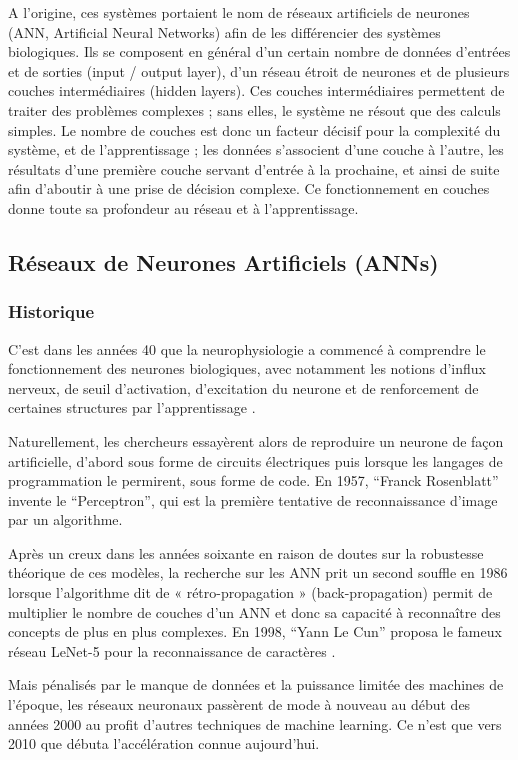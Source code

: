 \documentclass[12pt]{article}
\begin{document}
A l'origine, ces systèmes portaient le nom de réseaux artificiels de neurones (ANN, Artificial Neural Networks) afin de les différencier des systèmes biologiques. Ils se composent en général d’un certain nombre de données d'entrées et de sorties (input / output layer), d’un réseau étroit de neurones et de plusieurs couches intermédiaires (hidden layers). Ces couches intermédiaires permettent de traiter des problèmes complexes ; sans elles, le système ne résout que des calculs simples. Le nombre de couches est donc un facteur décisif pour la complexité du système, et de l’apprentissage ; les données s’associent d’une couche à l’autre, les résultats d’une première couche servant d’entrée à la prochaine, et ainsi de suite afin d’aboutir à une prise de décision complexe. Ce fonctionnement en couches donne toute sa profondeur au réseau et à l’apprentissage.
\subsection{Réseaux de Neurones Artificiels (ANNs)}
\subsubsection{Historique}
C’est dans les années 40 que la neurophysiologie a commencé à comprendre le fonctionnement des neurones biologiques, avec notamment les notions d’influx nerveux, de seuil d’activation, d’excitation du neurone et de renforcement de certaines structures par l’apprentissage \cite{11}.

Naturellement, les chercheurs essayèrent alors de reproduire un neurone de façon artificielle, d’abord sous forme de circuits électriques puis lorsque les langages de programmation le permirent, sous forme de code. En 1957, “Franck Rosenblatt” invente le “Perceptron”, qui est la première tentative de reconnaissance d’image par un algorithme.

Après un creux dans les années soixante en raison de doutes sur la robustesse théorique de ces modèles, la recherche sur les ANN prit un second souffle en 1986 lorsque l’algorithme dit de « rétro-propagation » (back-propagation) permit de multiplier le nombre de couches d’un ANN et donc sa capacité à reconnaître des concepts de plus en plus complexes. En 1998, “Yann Le Cun” proposa le fameux réseau LeNet-5 pour la reconnaissance de caractères \cite{11}.

Mais pénalisés par le manque de données et la puissance limitée des machines de l’époque, les réseaux neuronaux passèrent de mode à nouveau au début des années 2000 au profit d’autres techniques de machine learning. Ce n’est que vers 2010 que débuta l’accélération connue aujourd’hui.
\end{document}

